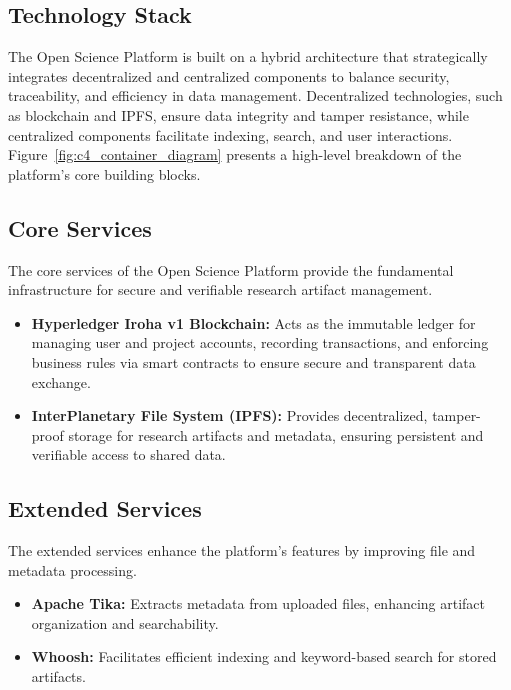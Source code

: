 \documentclass{article}
\begin{document}
\subsection{Technology Stack}
The Open Science Platform is built on a hybrid architecture that strategically integrates decentralized and centralized components to balance security, traceability, and efficiency in data management. Decentralized technologies, such as blockchain and IPFS, ensure data integrity and tamper resistance, while centralized components facilitate indexing, search, and user interactions. Figure~\ref{fig:c4_container_diagram} presents a high-level breakdown of the platform's core building blocks.

\subsection{Core Services}

The core services of the Open Science Platform provide the fundamental infrastructure for secure and verifiable research artifact management.

\begin{itemize}
      \item \textbf{Hyperledger Iroha v1 Blockchain:} Acts as the immutable ledger for managing user and project accounts, recording transactions, and enforcing business rules via smart contracts to ensure secure and transparent data exchange.
      \item \textbf{InterPlanetary File System (IPFS):} Provides decentralized, tamper-proof storage for research artifacts and metadata, ensuring persistent and verifiable access to shared data.
\end{itemize}

\subsection{Extended Services}

The extended services enhance the platform's features by improving file and metadata processing.

\begin{itemize}
      \item \textbf{Apache Tika:} Extracts metadata from uploaded files, enhancing artifact organization and searchability.
      \item \textbf{Whoosh:} Facilitates efficient indexing and keyword-based search for stored artifacts.
\end{itemize}
\end{document}

